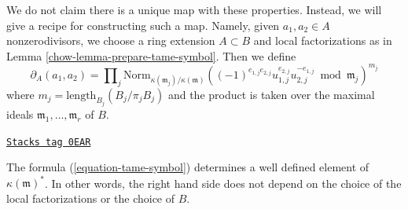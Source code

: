 \medskip\noindent
We do not claim there is a unique map with these properties.
Instead, we will give a recipe for constructing such a map.
Namely, given $a_1, a_2 \in A$ nonzerodivisors, we choose
a ring extension $A \subset B$ and local factorizations
as in Lemma \ref{chow-lemma-prepare-tame-symbol}.
Then we define
\begin{equation}
\label{equation-tame-symbol}
\partial_A(a_1, a_2) = \prod\nolimits_j
\text{Norm}_{\kappa(\mathfrak m_j)/\kappa(\mathfrak m)}
((-1)^{e_{1, j}e_{2, j}}u_{1, j}^{e_{2, j}}u_{2, j}^{-e_{1, j}}
\bmod \mathfrak m_j)^{m_j}
\end{equation}
where $m_j = \text{length}_{B_j}(B_j/\pi_j B_j)$ and the product
is taken over the maximal ideals $\mathfrak m_1, \ldots, \mathfrak m_r$ of $B$.

\begin{lemma}
\label{chow-lemma-well-defined-tame-symbol}
\href{https://stacks.math.columbia.edu/tag/0EAR}{\texttt{Stacks tag 0EAR}}

The formula (\ref{equation-tame-symbol}) determines a
well defined element of $\kappa(\mathfrak m)^*$. In other words, the
right hand side does not depend on the choice of the
local factorizations or the choice of $B$.
\end{lemma}

